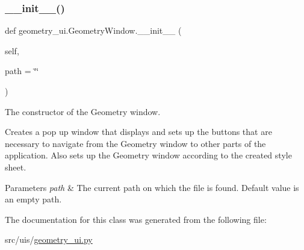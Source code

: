 \subsubsection{\texorpdfstring{\+\_\+\+\_\+init\+\_\+\+\_\+()}{\_\_init\_\_()}}
{\footnotesize\ttfamily def geometry\+\_\+ui.\+Geometry\+Window.\+\_\+\+\_\+init\+\_\+\+\_\+ (\begin{DoxyParamCaption}\item[{}]{self,  }\item[{}]{path = {\ttfamily \char`\"{}\char`\"{}} }\end{DoxyParamCaption})}



The constructor of the Geometry window. 

Creates a pop up window that displays and sets up the buttons that are necessary to navigate from the Geometry window to other parts of the application. Also sets up the Geometry window according to the created style sheet. 
\begin{DoxyParams}{Parameters}
{\em path} & The current path on which the file is found. Default value is an empty path. \\
\hline
\end{DoxyParams}


The documentation for this class was generated from the following file\+:\begin{DoxyCompactItemize}
\item 
src/uis/\hyperlink{geometry__ui_8py}{geometry\+\_\+ui.\+py}\end{DoxyCompactItemize}
